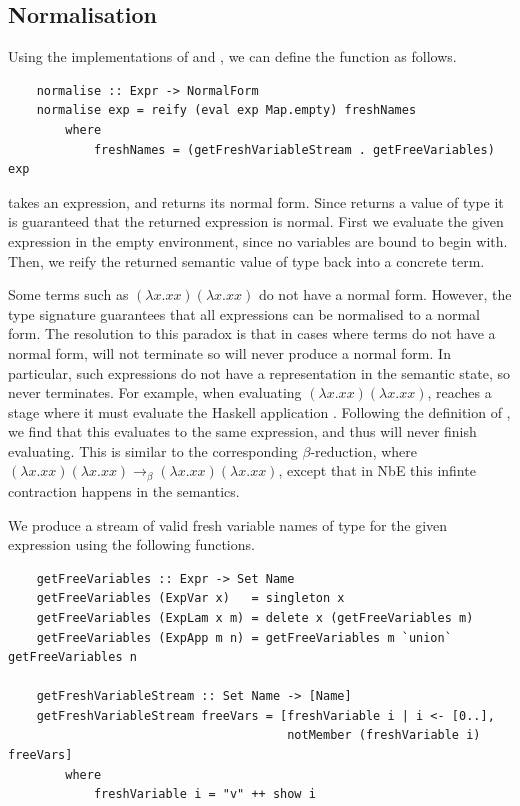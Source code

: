 \subsection{Normalisation}

Using the implementations of  and , we can define the  function as follows.

\begin{lstlisting}
    normalise :: Expr -> NormalForm
    normalise exp = reify (eval exp Map.empty) freshNames
        where
            freshNames = (getFreshVariableStream . getFreeVariables) exp
\end{lstlisting}

 takes an expression, and returns its normal form. Since  returns a value of type  it is guaranteed that the returned expression is normal. First we evaluate the given expression in the empty environment, since no variables are bound to begin with. Then, we reify the returned semantic value of type  back into a concrete  term. 

Some terms such as $(\lambda x.x x)(\lambda x.x x)$ do not have a normal form. However, the  type signature guarantees that all expressions can be normalised to a normal form. The resolution to this paradox is that in cases where terms do not have a normal form,  will not terminate so will never produce a normal form. In particular, such expressions do not have a representation in the semantic state, so  never terminates. For example, when evaluating $(\lambda x.x x)(\lambda x.x x)$,  reaches a stage where it must evaluate the Haskell application . Following the definition of , we find that this evaluates to the same expression, and thus will never finish evaluating. This is similar to the corresponding $\beta$-reduction, where $(\lambda x.x x)(\lambda x.x x) \rightarrow_\beta (\lambda x.x x)(\lambda x.x x)$, except that in NbE this infinte contraction happens in the semantics.

We produce a stream of valid fresh variable names  of type \code{[Name]} for the given expression using the following functions.

\begin{lstlisting}
    getFreeVariables :: Expr -> Set Name
    getFreeVariables (ExpVar x)   = singleton x
    getFreeVariables (ExpLam x m) = delete x (getFreeVariables m)
    getFreeVariables (ExpApp m n) = getFreeVariables m `union` getFreeVariables n

    getFreshVariableStream :: Set Name -> [Name]
    getFreshVariableStream freeVars = [freshVariable i | i <- [0..], 
                                       notMember (freshVariable i) freeVars] 
        where
            freshVariable i = "v" ++ show i
\end{lstlisting}

